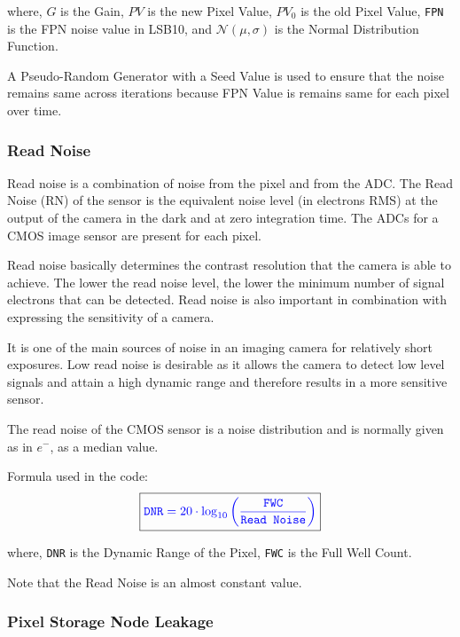 \documentclass[../../main.tex]{subfiles}
\begin{document}
where, $G$ is the Gain, $PV$ is the new Pixel Value, $PV_0$ is the old Pixel Value, \texttt{FPN} is the FPN noise value in LSB10, and $\mathcal{N}(\mu, \sigma)$ is the Normal Distribution Function.

A Pseudo-Random Generator with a Seed Value is used to ensure that the noise remains same across iterations because FPN Value is remains same for each pixel over time.


\subsubsection{Read Noise} %
Read noise is a combination of noise from the pixel and from the ADC. The Read Noise (RN) of the sensor is the equivalent noise level (in electrons RMS) at the output of the camera in the dark and at zero integration time. The ADCs for a CMOS image sensor are present for each pixel.

Read noise basically determines the contrast resolution that the camera is able to achieve. The lower the read noise level, the lower the minimum number of signal electrons that can be detected. Read noise is also important in combination with expressing the sensitivity of a camera. 

It is one of the main sources of noise in an imaging camera for relatively short exposures. Low read noise is desirable as it allows the camera to detect low level signals and attain a high dynamic range and therefore results in a more sensitive sensor.

The read noise of the CMOS sensor is a noise distribution and is normally given as in $e^-$, as a median value.

Formula used in the code:
\begin{equation}
    \boxed{ \color{blue} \texttt{DNR} = 20 \cdot \log_{10} \left(\frac{\texttt{FWC}}{\texttt{Read Noise}} \right) \color{black} }
\end{equation}

where, \texttt{DNR} is the Dynamic Range of the Pixel, \texttt{FWC} is the Full Well Count. 

Note that the Read Noise is an almost constant value.


\subsubsection{Pixel Storage Node Leakage} %
\end{document}
